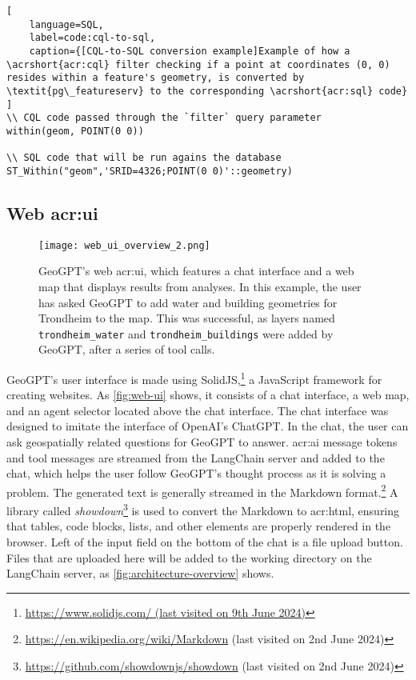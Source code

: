 \begin{lstlisting}[
    language=SQL,
    label=code:cql-to-sql,
    caption={[CQL-to-SQL conversion example]Example of how a \acrshort{acr:cql} filter checking if a point at coordinates (0, 0) resides within a feature's geometry, is converted by \textit{pg\_featureserv} to the corresponding \acrshort{acr:sql} code} 
]
\\ CQL code passed through the `filter` query parameter
within(geom, POINT(0 0))

\\ SQL code that will be run agains the database
ST_Within("geom",'SRID=4326;POINT(0 0)'::geometry)
\end{lstlisting}


\subsection[Web UI]{Web \acrshort{acr:ui}}
\label{subsec:web-ui}

\begin{figure}[h]
    \centering
    \texttt{[image: web\_ui\_overview\_2.png]}
    \caption[GeoGPT's web UI]{GeoGPT's web \acrshort{acr:ui}, which features a chat interface and a web map that displays results from analyses. In this example, the user has asked GeoGPT to add water and building geometries for Trondheim to the map. This was successful, as layers named \texttt{trondheim\_water} and \texttt{trondheim\_buildings} were added by GeoGPT, after a series of tool calls.}
    \label{fig:web-ui}
\end{figure}

GeoGPT's user interface is made using SolidJS,\footnote{\url{https://www.solidjs.com/ (last visited on 9th June 2024)}} a JavaScript framework for creating websites. As \autoref{fig:web-ui} shows, it consists of a chat interface, a web map, and an agent selector located above the chat interface. The chat interface was designed to imitate the interface of OpenAI's ChatGPT. In the chat, the user can ask geospatially related questions for GeoGPT to answer. \acrshort{acr:ai} message tokens and tool messages are streamed from the LangChain server and added to the chat, which helps the user follow GeoGPT's thought process as it is solving a problem. The generated text is generally streamed in the Markdown format.\footnote{\url{https://en.wikipedia.org/wiki/Markdown} (last visited on 2nd June 2024)} A library called \textit{showdown}\footnote{\url{https://github.com/showdownjs/showdown} (last visited on 2nd June 2024)} is used to convert the Markdown to \acrshort{acr:html}, ensuring that tables, code blocks, lists, and other elements are properly rendered in the browser. Left of the input field on the bottom of the chat is a file upload button. Files that are uploaded here will be added to the working directory on the LangChain server, as \autoref{fig:architecture-overview} shows.

